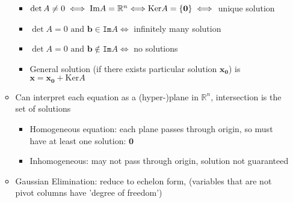 \begin{itemize}
\begin{itemize}
\begin{itemize}
                              \item $\det A\neq0\iff\mathtt{\textrm{Im}}A=\mathbb{R}^{n}\textrm{\ensuremath{\iff}}\textrm{Ker}A=\{\mathbf{0}\}\iff$
                                    unique solution
                              \item $\det A=0\textrm{ and }\mathbf{b}\in\mathtt{\textrm{Im}}A\iff$ infinitely
                                    many solution
                              \item $\det A=0\textrm{ and }\mathbf{b}\notin\mathtt{\textrm{Im}}A\iff$
                                    no solutions
                              \item General solution (if there exists particular solution $\mathbf{x_{0}}$)
                                    is $\mathbf{x}=\mathbf{x_{0}}+\textrm{Ker}A$
                        \end{itemize}
                  \item Can interpret each equation as a (hyper-)plane in $\mathbb{R}^{n}$,
                        intersection is the set of solutions
                        \begin{itemize}
                              \item Homogeneous equation: each plane passes through origin, so must have
                                    at least one solution: $\mathbf{0}$
                              \item Inhomogeneous: may not pass through origin, solution not guaranteed
                        \end{itemize}
                  \item Gaussian Elimination: reduce to echelon form, (variables that are
                        not pivot columns have 'degree of freedom')
            \end{itemize}
\end{itemize}

